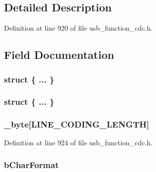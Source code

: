 \subsection{Detailed Description}


Definition at line 920 of file usb\+\_\+function\+\_\+cdc.\+h.



\subsection{Field Documentation}
\hypertarget{union___l_i_n_e___c_o_d_i_n_g_aa642d1643fe89fe7487237f873940aae}{}\subsubsection[{"@307}]{\setlength{\rightskip}{0pt plus 5cm}struct \{ ... \} }\label{union___l_i_n_e___c_o_d_i_n_g_aa642d1643fe89fe7487237f873940aae}
\hypertarget{union___l_i_n_e___c_o_d_i_n_g_a999d9ffac2acb5302cf0437d6e7844c3}{}\subsubsection[{"@309}]{\setlength{\rightskip}{0pt plus 5cm}struct \{ ... \} }\label{union___l_i_n_e___c_o_d_i_n_g_a999d9ffac2acb5302cf0437d6e7844c3}
\hypertarget{union___l_i_n_e___c_o_d_i_n_g_a3a0325c4645391fe20711434f6a6b223}{}
\subsubsection[{\+\_\+byte}]{ \+\_\+byte\mbox{[}{\bf L\+I\+N\+E\+\_\+\+C\+O\+D\+I\+N\+G\+\_\+\+L\+E\+N\+G\+T\+H}\mbox{]}}\label{union___l_i_n_e___c_o_d_i_n_g_a3a0325c4645391fe20711434f6a6b223}


Definition at line 924 of file usb\+\_\+function\+\_\+cdc.\+h.

\hypertarget{union___l_i_n_e___c_o_d_i_n_g_a946f73bf80c1a1df593f506d5381c22f}{}
\subsubsection[{b\+Char\+Format}]{ b\+Char\+Format}\label{union___l_i_n_e___c_o_d_i_n_g_a946f73bf80c1a1df593f506d5381c22f}


